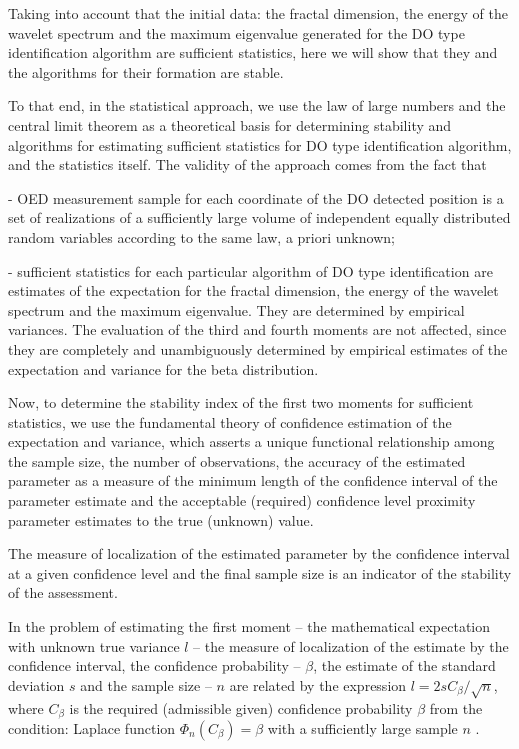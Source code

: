Taking into account that the initial data: the fractal dimension, the energy of the wavelet spectrum and the maximum eigenvalue generated for the DO type identification algorithm are sufficient statistics, here we will show that they and the algorithms for their formation are stable.

To that end, in the statistical approach, we use the law of large numbers and the central limit theorem as a theoretical basis \cite{bib_11} for determining stability and algorithms for estimating sufficient statistics for DO type identification algorithm, and the statistics itself.
The validity of the approach comes from the fact that

- OED measurement sample for each coordinate of the DO detected position is a set of realizations of a sufficiently large volume of independent equally distributed random variables according to the same law, a priori unknown;

- sufficient statistics for each particular algorithm of DO type identification are estimates of the expectation for the fractal dimension, the energy of the wavelet spectrum and the maximum eigenvalue.
They are determined by empirical variances.
The evaluation of the third and fourth moments are not affected, since they are completely and unambiguously determined by empirical estimates of the expectation and variance for the beta distribution.

Now, to determine the stability index of the first two moments for sufficient statistics, we use the fundamental theory of confidence estimation of the expectation and variance, which asserts a unique functional relationship among the sample size, the number of observations, the accuracy of the estimated parameter as a measure of the minimum length of the confidence interval of the parameter estimate and the acceptable (required) confidence level proximity parameter estimates to the true (unknown) value.

The measure of localization of the estimated parameter by the confidence interval at a given confidence level and the final sample size is an indicator of the stability of the assessment.

In the problem of estimating the first moment -- the mathematical expectation with unknown true variance $l$ -- the measure of localization of the estimate by the confidence interval, the confidence probability -- $\beta$, the estimate of the standard deviation $s$ and the sample size -- $n$ are related by the expression $l = 2sC_{\beta}/\sqrt{n}$, where $C_{\beta}$ is the required (admissible given) confidence probability $\beta$ from the condition: Laplace function $\Phi_n(C_{\beta}) = \beta$ with a sufficiently large sample $n$ \cite{bib_13,bib_14}.

